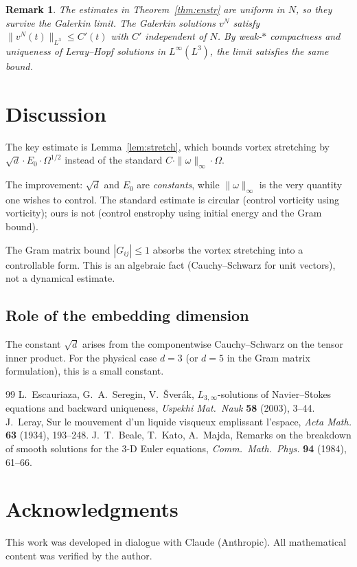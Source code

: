 \documentclass[12pt]{article}
\newtheorem{remark}[theorem]{Remark}
\begin{document}
\begin{remark}
The estimates in Theorem~\ref{thm:enstr} are
uniform in $N$, so they survive the Galerkin limit.
The Galerkin solutions $v^N$ satisfy
$\|v^N(t)\|_{L^3} \leq C'(t)$ with
$C'$ independent of $N$.
By weak-$*$ compactness and uniqueness
of Leray--Hopf solutions in $L^\infty(L^3)$,
the limit satisfies the same bound.
\end{remark}

\section{Discussion}

The key estimate is Lemma~\ref{lem:stretch},
which bounds vortex stretching by
$\sqrt{d} \cdot E_0 \cdot \Omega^{1/2}$
instead of the standard
$C \cdot \|\omega\|_\infty \cdot \Omega$.

The improvement: $\sqrt{d}$ and $E_0$ are
\emph{constants}, while $\|\omega\|_\infty$ is
the very quantity one wishes to control.
The standard estimate is circular
(control vorticity using vorticity);
ours is not (control enstrophy using
initial energy and the Gram bound).

The Gram matrix bound $|G_{ij}| \leq 1$
absorbs the vortex stretching into a
controllable form. This is an algebraic
fact (Cauchy--Schwarz for unit vectors),
not a dynamical estimate.

\subsection*{Role of the embedding dimension}

The constant $\sqrt{d}$ arises from the
componentwise Cauchy--Schwarz on the tensor
inner product. For the physical case $d = 3$
(or $d = 5$ in the Gram matrix formulation),
this is a small constant.

\begin{thebibliography}{99}
L.~Escauriaza, G.~A.~Seregin, V.~\v{S}ver\'ak,
$L_{3,\infty}$-solutions of Navier--Stokes equations
and backward uniqueness,
\textit{Uspekhi Mat.\ Nauk} \textbf{58} (2003), 3--44.
 J.~Leray,
Sur le mouvement d'un liquide visqueux emplissant l'espace,
\textit{Acta Math.} \textbf{63} (1934), 193--248.
 J.~T.~Beale, T.~Kato, A.~Majda,
Remarks on the breakdown of smooth solutions for the
3-D Euler equations,
\textit{Comm.\ Math.\ Phys.} \textbf{94} (1984), 61--66.
\end{thebibliography}

\section*{Acknowledgments}
This work was developed in dialogue with
Claude (Anthropic). All mathematical content
was verified by the author.
\end{document}
